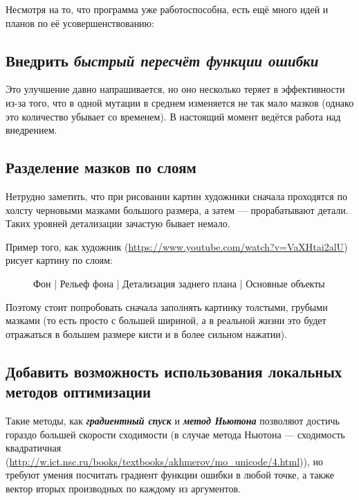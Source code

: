 Несмотря на то, что программа уже работоспособна, есть ещё много идей и планов по её усовершенствованию:


 \subsection{Внедрить \textit{быстрый пересчёт функции ошибки}}
Это улучшение давно напрашивается,
но оно несколько теряет в эффективности из-за того, что в одной мутации в среднем изменяется
не так мало мазков (однако это количество убывает со временем).
В настоящий момент ведётся работа над внедрением.

\subsection{Разделение мазков по слоям}
 Нетрудно заметить, что при рисовании картин художники сначала проходятся по холсту черновыми мазками большого размера, а затем — прорабатывают детали.
 Таких уровней детализации зачастую бывает немало.

 Пример того, как художник (\url{https://www.youtube.com/watch?v=VaXHtai2alU}) рисует картину по слоям:

\begin{figure}[h!]
    \centering
    \caption{ Фон | Рельеф фона | Детализация заднего плана | Основные объекты}
    \label{fig:layered_painting}
\end{figure}
\FloatBarrier


Поэтому стоит попробовать сначала заполнять картинку толстыми, грубыми мазками
(то есть просто с большей шириной, а в реальной жизни это будет отражаться в большем размере кисти и в более сильном нажатии).

\subsection{Добавить возможность использования локальных методов оптимизации}\label{subsec:local-methods}
Такие методы, как \textbf\textit{{градиентный спуск}} и \textbf\textit{{метод Ньютона}} позволяют достичь гораздо большей скорости сходимости
(в случае метода Ньютона — сходимость квадратичная (\url{http://w.ict.nsc.ru/books/textbooks/akhmerov/mo_unicode/4.html})),
но требуют умения посчитать градиент функции ошибки в любой точке, а также вектор вторых производных по каждому из аргументов.

